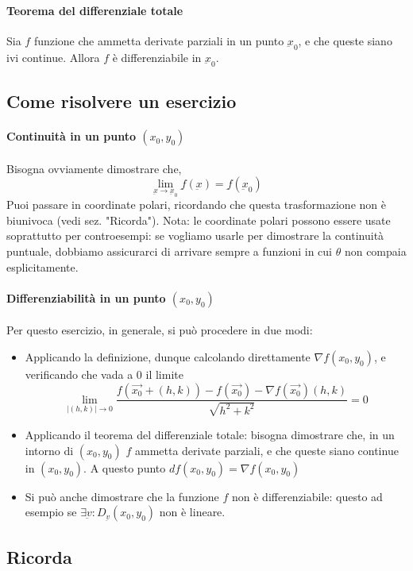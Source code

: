 \documentclass[a4paper,12pt]{article}
\newcommand{\ubar}{\underbar}
\begin{document}
\paragraph{Teorema del differenziale totale}
Sia $f$ funzione che ammetta derivate parziali in un punto $\underbar{x}_0$, e che queste siano ivi continue. Allora $f$ è differenziabile in $\underbar{x}_0$.
\subsection{Come risolvere un esercizio}
\paragraph{Continuità in un punto $(x_0, y_0)$}

Bisogna ovviamente dimostrare che, $$\lim_{\ubar{x}\rightarrow\ubar{x}_0}\ubar{f}(\ubar{x}) = \ubar{f}(\ubar{x}_0)$$
Puoi passare in coordinate polari, ricordando che questa trasformazione non è biunivoca (vedi sez. "Ricorda"). Nota: le coordinate polari possono essere usate soprattutto per controesempi: se vogliamo usarle per dimostrare la continuità puntuale, dobbiamo assicurarci di arrivare sempre a funzioni in cui $\theta$ non compaia esplicitamente.

\paragraph{Differenziabilità in un punto $(x_0, y_0)$}
Per questo esercizio, in generale, si può procedere in due modi:
\begin{itemize}
 \item Applicando la definizione, dunque calcolando direttamente $\nabla f(x_0, y_0)$, e verificando che vada a 0 il limite
 $$\lim_{|(h, k)| \to 0} \dfrac{f(\vec{x_0}+(h, k)) - f(\vec{x_0}) - \nabla f(\vec{x_0})(h, k)}{\sqrt{h^2+k^2}} = 0 $$
 \item Applicando il teorema del differenziale totale: bisogna dimostrare che, in un intorno di $(x_0, y_0)$ $f$ ammetta derivate parziali, e che queste siano continue in $(x_0, y_0)$. A questo punto $df(x_0, y_0) = \nabla f(x_0, y_0)$
 \item Si può anche dimostrare che la funzione $f$ non è differenziabile: questo ad esempio se $\exists \underbar{v}: D_{\underbar{v}}(x_0, y_0)$ non è lineare.
\end{itemize}

\subsection{Ricorda}
\end{document}
